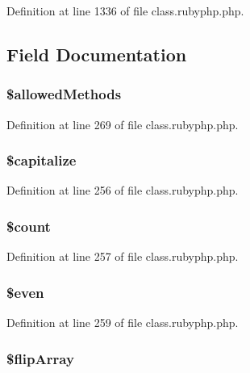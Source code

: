Definition at line 1336 of file class.\-rubyphp.\-php.



\subsection{Field Documentation}
\hypertarget{classr_ab278eba7cab5341dacdccecd7a2cc2df}{
\subsubsection[{\$allowed\-Methods}]{\setlength{\rightskip}{0pt plus 5cm}\$allowed\-Methods}}\label{classr_ab278eba7cab5341dacdccecd7a2cc2df}


Definition at line 269 of file class.\-rubyphp.\-php.

\hypertarget{classr_a41c83fecb936997f3e2dae40207e31dd}{
\subsubsection[{\$capitalize}]{\setlength{\rightskip}{0pt plus 5cm}\$capitalize}}\label{classr_a41c83fecb936997f3e2dae40207e31dd}


Definition at line 256 of file class.\-rubyphp.\-php.

\hypertarget{classr_af789423037bbc89dc7c850e761177570}{
\subsubsection[{\$count}]{\setlength{\rightskip}{0pt plus 5cm}\$count}}\label{classr_af789423037bbc89dc7c850e761177570}


Definition at line 257 of file class.\-rubyphp.\-php.

\hypertarget{classr_ab661cd196618c18d23108b83a10728f3}{
\subsubsection[{\$even}]{\setlength{\rightskip}{0pt plus 5cm}\${\bf even}}}\label{classr_ab661cd196618c18d23108b83a10728f3}


Definition at line 259 of file class.\-rubyphp.\-php.

\hypertarget{classr_a530c822a487ad325618509d8bf48553a}{
\subsubsection[{\$flip\-Array}]{\setlength{\rightskip}{0pt plus 5cm}\$flip\-Array}}\label{classr_a530c822a487ad325618509d8bf48553a}


